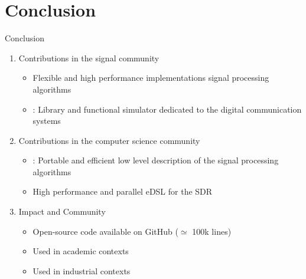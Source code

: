 
\section[Conclusion]{Conclusion}


\begin{frame}{Conclusion}
  \vfill
  \begin{enumerate}
    \item Contributions in the signal community
    \begin{itemize}
      \item Flexible and high performance implementations signal processing algorithms~\cite{Cassagne2015c,Cassagne2016a,Cassagne2016b,Leonardon2019,Ghaffari2019}
      \item \AFFECT: Library and functional simulator dedicated to the digital communication systems~\cite{Cassagne2017,Cassagne2017a,Cassagne2019a}
    \end{itemize}
    \vspace{0.3cm}
    \pause
    \item Contributions in the computer science community
    \begin{itemize}
      \item \MIPP: Portable and efficient low level description of the signal processing algorithms~\cite{Cassagne2018}
      \item High performance and parallel eDSL for the SDR
    \end{itemize}
    \vspace{0.3cm}
    \pause
    \item Impact and Community
    \begin{itemize}
      \item Open-source code available on GitHub ($\simeq $ 100k lines)
      \item Used in academic contexts
      \item Used in industrial contexts
    \end{itemize}
  \end{enumerate}
  \vfill
\end{frame}


